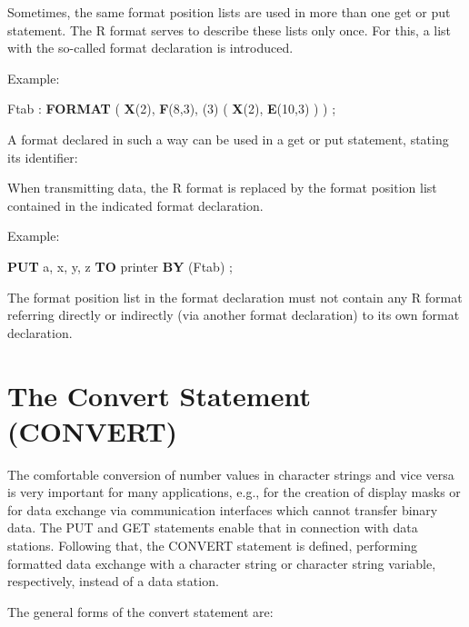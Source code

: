 Sometimes, the same format position lists are used in more than one get
or put statement. The R format serves to describe these lists only
once. For this, a list with the so-called format declaration is
introduced.



Example:

Ftab : {\bf FORMAT} ( {\bf X}(2), {\bf F}(8,3), (3) ( {\bf X}(2), {\bf E}(10,3) ) ) ;

A format declared in such a way can be used in a get or put statement,
stating its identifier:



When transmitting data, the R format is replaced by the format position
list contained in the indicated format declaration.

Example:

{\bf PUT} a, x, y, z {\bf TO} printer {\bf BY }(Ftab) ;

The format position list in the format declaration must not contain any
R format referring directly or indirectly (via another format
declaration) to its own format declaration.

\section{The Convert Statement (CONVERT)}   %
\label{sec_convert}

The comfortable conversion of number values in character strings and
vice versa is very important for many applications, e.g., for the
creation of display masks or for data exchange via communication
interfaces which cannot transfer binary data. The PUT and GET
statements enable that in connection with data stations. Following
that, the CONVERT statement is defined, performing formatted data
exchange with a character string or character string variable,
respectively, instead of a data station.

The general forms of the convert statement are:

